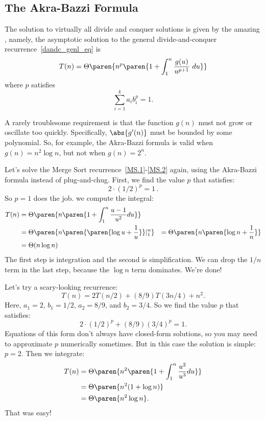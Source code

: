 \subsection{The Akra-Bazzi Formula}

The solution to virtually all divide and conquer solutions is given by
the amazing , namely,
the asymptotic solution to the general
divide-and-conquer recurrence~\eqref{dandc_genl_eq} is
\[
T(n) = \Theta\paren{n^p \paren{1 + \int_1^n \frac{g(u)}{u^{p+1}}\ du}}
\]
where $p$ satisfies
\[
\sum_{i=1}^k {a_i b_i^p} = 1.
\]

A rarely troublesome requirement is that the function $g(n)$ must not
grow or oscillate too quickly.  Specifically, $\abs{g'(n)}$ must be
bounded by some polynomial.  So, for example, the Akra-Bazzi formula
is valid when $g(n) = n^2 \log n$, but not when $g(n) = 2^n$.

Let's solve the Merge Sort recurrence~\eqref{MS.1}-\eqref{MS.2} again,
using the Akra-Bazzi formula instead of plug-and-chug.  First, we find
the value $p$ that satisfies:
\[
2 \cdot (1/2)^p = 1\, .
\]
So $p = 1$ does the job.  
we compute the integral:
\begin{align*}
T(n) & = \Theta\paren{n \paren{1 + \int_1^n \frac{u - 1}{u^2} du}} \\
  & = \Theta\paren{n\paren{\paren{\log u + \frac{1}{u}}}|_1^n}
  & = \Theta\paren{n \paren{\log n + \frac{1}{n}}} \\
  & = \Theta(n\log n)
\end{align*}
The first step is integration and the second is simplification.  We
can drop the $1/n$ term in the last step, because the $\log n$ term
dominates.  We're done!

Let's try a scary-looking recurrence:
\[
T(n) = 2T(n/2) + (8/9)T(3n/4) + n^2.
\]
Here, $a_1 = 2$, $b_1 = 1/2$, $a_2 = 8/9$, and $b_2 = 3/4$.  So we
find the value $p$ that satisfies:
\[
2 \cdot (1/2)^p + (8/9) (3/4)^p = 1.
\]
Equations of this form don't always have closed-form solutions, so you
may need to approximate $p$ numerically sometimes.  But in this case
the solution is simple: $p = 2$.  Then we integrate:
\begin{align*}
T(n) & = \Theta\paren{n^2 \paren{1 + \int_1^n \frac{u^2}{u^3} du}} \\
  & = \Theta\paren{n^2 (1 + \log n)} \\
  & = \Theta\paren{n^2 \log n}.
\end{align*}
That was easy!

